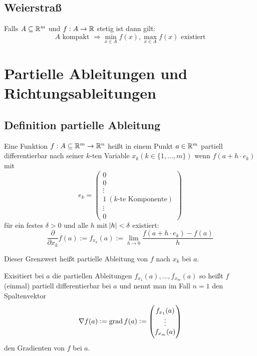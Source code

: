 \subsection{Weierstraß}
Falls $A \subseteq \mathbb{R}^m$ und $f: A \rightarrow \mathbb{R}$ stetig ist dann gilt:
\begin{equation*}
    A \text{ kompakt } \Rightarrow \min_{x \in A} f(x), \max_{x \in A} f(x)
    \text{ existiert}
\end{equation*}


\section{Partielle Ableitungen und Richtungsableitungen}
\subsection{Definition partielle Ableitung}
Eine Funktion $f: A \subseteq \mathbb{R}^m \rightarrow \mathbb{R}^n$ heißt in einem Punkt
$a \in \mathbb{R}^m$ partiell differentierbar nach seiner $k$-ten Variable $x_k
(k \in \{ 1, \ldots, m\})$ wenn $f(a + h \cdot e_k)$ mit
\begin{equation*}
    e_k = \begin{pmatrix}
        0 \\ 0 \\ \vdots \\ 1\ (k\text{-te Komponente}) \\ \vdots \\ 0
    \end{pmatrix}
\end{equation*}
für ein festes $\delta > 0$ und alle $h$ mit $\abs{h} < \delta$ existiert:
\begin{equation*}
    \frac{\partial}{\partial x_k} f(a) := f_{x_k} (a) :=
    \lim_{h \rightarrow 0} \frac{f(a + h \cdot e_k) - f(a)}{h}
\end{equation*}

Dieser Grenzwert heißt partielle Ableitung von $f$ nach $x_k$ bei $a$.

\vspace{0.5cm}

Exisitiert bei $a$ die partiellen Ableitungen $f_{x_1}(a), \ldots, f_{x_m}(a)$
so heißt $f$ (einmal) partiell differentierbar bei $a$ und nennt man im Fall $n=1$
den Spaltenvektor
\begin{equation*}
    \nabla f(a) := \operatorname{grad} f(a) :=
    \begin{pmatrix}
        f_{x_1}(a) \\ \vdots \\ f_{x_m}(a)
    \end{pmatrix}
\end{equation*}
den Gradienten von $f$ bei $a$.

